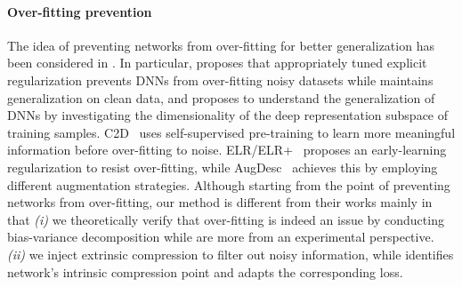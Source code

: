 \documentclass[journal]{IEEEtran}
\begin{document}
\paragraph{Over-fitting prevention}
The idea of preventing networks from over-fitting for better generalization has been considered in \cite{arpit2017closer,ma2018dimensionality}.
In particular, \cite{arpit2017closer} proposes that appropriately tuned explicit regularization prevents DNNs from over-fitting noisy datasets while maintains generalization on
clean data, and
\cite{ma2018dimensionality} proposes to understand the generalization of DNNs by investigating the dimensionality of the deep representation subspace of training samples.
C2D~\cite{zheltonozhskii2022contrast} uses self-supervised pre-training to learn more meaningful information before over-fitting to noise.
ELR/ELR+~\cite{liu2020early} proposes an early-learning regularization to resist over-fitting, while AugDesc~\cite{nishi2021augmentation} achieves this by employing different augmentation strategies.
Although starting from the point of preventing networks from over-fitting, our method is different from their works mainly in that 
\textit{(i)} we theoretically verify that over-fitting is indeed an issue by conducting bias-variance decomposition while \cite{arpit2017closer, ma2018dimensionality, zheltonozhskii2022contrast,nishi2021augmentation} are more from an experimental perspective.
\textit{(ii)} we inject extrinsic compression to filter out noisy information, while \cite{ma2018dimensionality} identifies network's intrinsic compression point and adapts the corresponding loss.
\end{document}
